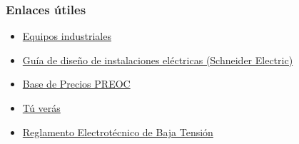 \documentclass[serif, xcolor=dvipsnames]{beamer}
\begin{document}
\begin{frame}
  \frametitle{Enlaces útiles}

  \begin{itemize}
  \item \href{http://www.directindustry.com/}{Equipos industriales}
  \item
    \href{http://www.schneiderelectric.es/sites/spain/es/productos-servicios/distribucion-electrica/descarga/pdf-guia-diseno-instalaciones-electricas.page}{Guía
      de diseño de instalaciones eléctricas (Schneider Electric)}
  \item \href{http://www.preoc.es/}{Base de Precios PREOC}
  \item \href{http://tuveras.com/index.html}{Tú verás}
  \item
    \href{http://www.f2i2.net/legislacionseguridadindustrial/legislacionNacionalGrupo.aspx?idregl=76}{Reglamento
      Electrotécnico de Baja Tensión}
  \end{itemize}

\end{frame}
\end{document}
